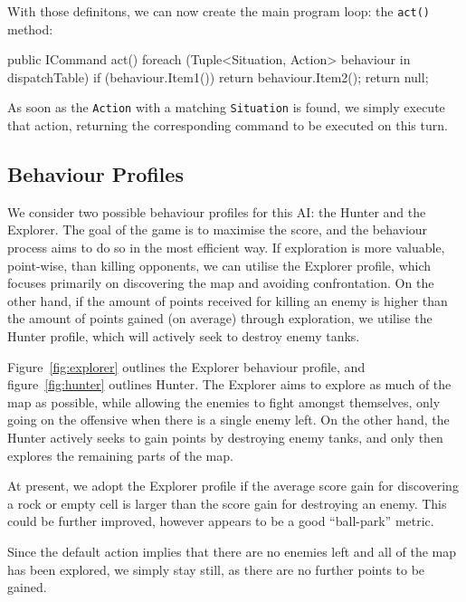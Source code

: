 \documentclass[11pt]{article}
\begin{document}
With those definitons, we can now create the main program loop: the \verb|act()| method:

\begin{code}
public ICommand act()
{
  foreach (Tuple<Situation, Action> behaviour in dispatchTable)
  {
    if (behaviour.Item1())
    {
      return behaviour.Item2();
    }
  }
  return null;
}
\end{code}

As soon as the \verb|Action| with a matching \verb|Situation| is found, we simply execute that action, returning the corresponding command to be executed on this turn.

\subsection{Behaviour Profiles} \label{sec:behaviourProfiles}

We consider two possible behaviour profiles for this AI: the Hunter and the Explorer. The goal of the game is to maximise the score, and the behaviour process aims to do so in the most efficient way. If exploration is more valuable, point-wise, than killing opponents, we can utilise the Explorer profile, which focuses primarily on discovering the map and avoiding confrontation. On the other hand, if the amount of points received for killing an enemy is higher than the amount of points gained (on average) through exploration, we utilise the Hunter profile, which will actively seek to destroy enemy tanks.

Figure~\ref{fig:explorer} outlines the Explorer behaviour profile, and figure~\ref{fig:hunter} outlines Hunter. The Explorer aims to explore as much of the map as possible, while allowing the enemies to fight amongst themselves, only going on the offensive when there is a single enemy left. On the other hand, the Hunter actively seeks to gain points by destroying enemy tanks, and only then explores the remaining parts of the map.

At present, we adopt the Explorer profile if the average score gain for discovering a rock or empty cell is larger than the score gain for destroying an enemy. This could be further improved, however appears to be a good ``ball-park'' metric.

Since the default action implies that there are no enemies left and all of the map has been explored, we simply stay still, as there are no further points to be gained.
\end{document}
